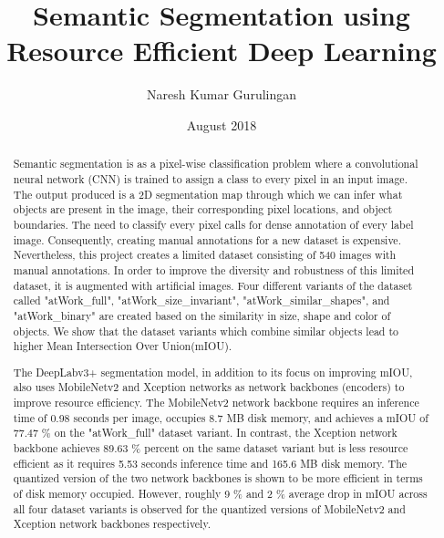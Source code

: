 \documentclass[rnd]{mas_report}
\author{Naresh Kumar Gurulingan}
\title{Semantic Segmentation using Resource Efficient Deep Learning}
\date{August 2018}
\begin{document}
\begin{titlepage}
    \maketitle
\end{titlepage}


\pagestyle{plain}


\cleardoublepage
\statementpage

\begin{abstract}
Semantic segmentation is as a pixel-wise classification problem where a convolutional neural network (CNN) is trained to assign a class to every pixel in an input image. The output produced is a 2D segmentation map through which we can infer what objects are present in the image, their corresponding pixel locations, and object boundaries. The need to classify every pixel calls for dense annotation of every label image. Consequently, creating manual annotations for a new dataset is expensive. Nevertheless, this project creates a limited dataset consisting of 540 images with manual annotations. In order to improve the diversity and robustness of this limited dataset, it is augmented with artificial images. Four different variants of the dataset called "atWork\_full", "atWork\_size\_invariant", "atWork\_similar\_shapes", and "atWork\_binary" are created based on the similarity in size, shape and color of objects. We show that the dataset variants which combine similar objects lead to higher Mean Intersection Over Union(mIOU). 

The DeepLabv3+ segmentation model, in addition to its focus on improving mIOU, also uses MobileNetv2 and Xception networks as network backbones (encoders) to improve resource efficiency. The MobileNetv2 network backbone requires an inference time of 0.98 seconds per image, occupies 8.7 MB disk memory, and achieves a mIOU of 77.47 \% on the "atWork\_full" dataset variant. In contrast, the Xception network backbone achieves 89.63 \% percent on the same dataset variant but is less resource efficient as it requires 5.53 seconds inference time and 165.6 MB disk memory. The quantized version of the two network backbones is shown to be more efficient in terms of disk memory occupied. However, roughly 9 \% and 2 \% average drop in mIOU across all four dataset variants is observed for the quantized versions of MobileNetv2 and Xception network backbones respectively.
\end{abstract}
\end{document}
